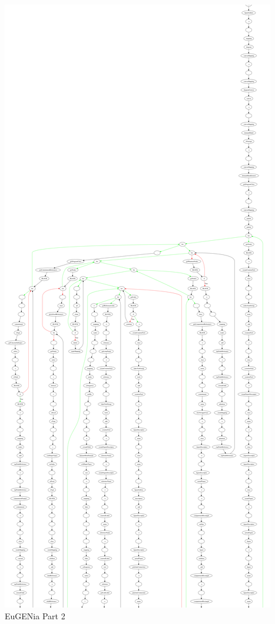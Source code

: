 \begin{minipage}[b]{\textwidth}
\centering
\includegraphics[height=0.97\textheight]{./figures/eug_2.png}
EuGENia Part 2
\end{minipage}
